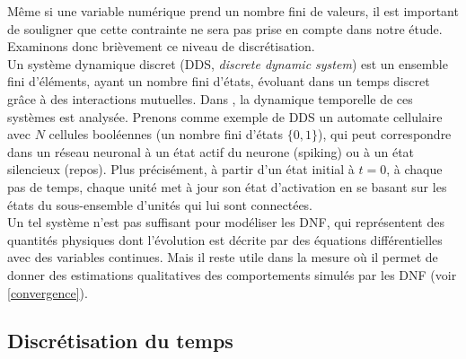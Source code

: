 Même si une variable numérique prend un nombre fini de valeurs, il est important de souligner que cette contrainte ne sera pas prise en compte dans notre étude. Examinons donc brièvement ce niveau de discrétisation.\\

Un système dynamique discret (DDS, \textit{discrete dynamic system}) est un ensemble fini d'éléments, ayant un nombre fini d'états, évoluant dans un temps discret grâce à des interactions mutuelles. Dans \cite{Robert:1994}, la dynamique temporelle de ces systèmes est analysée. Prenons comme exemple de DDS  un automate cellulaire avec $N $ cellules booléennes (un nombre fini d'états $\{0,1\}$), qui peut correspondre dans un réseau neuronal à un état actif du neurone (spiking) ou à un état ​​silencieux (repos). Plus précisément, à partir d'un état ​​initial à $ t = 0 $, à chaque pas de temps, chaque unité met à jour son état ​​d'activation en se basant sur les états du sous-ensemble d'unités qui lui sont connectées.\\

Un tel système n'est pas suffisant pour modéliser les DNF, qui représentent des quantités physiques dont l'évolution est décrite par des équations différentielles avec des variables continues. Mais il reste utile dans la mesure o\`u il permet de donner des estimations qualitatives des comportements simulés par les DNF (voir \ref{convergence}).\\


%
\subsection{Discrétisation du temps}

